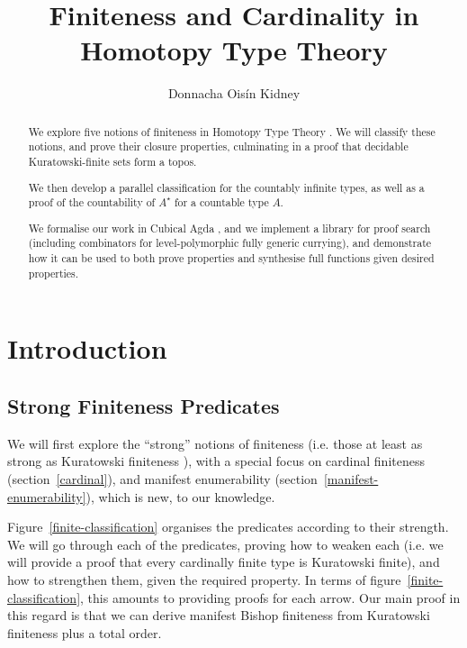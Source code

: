 
\title{Finiteness and Cardinality in Homotopy Type Theory}
\author{Donnacha Oisín Kidney}

\maketitle
\begin{abstract}
  We explore five notions of finiteness in Homotopy Type Theory \cite{hottbook}.
  We will classify these notions, and prove their closure properties,
  culminating in a proof that decidable Kuratowski-finite sets
  \cite{kuratowskiNotionEnsembleFini1920} form a topos.

  We then develop a parallel classification for the countably infinite types, as
  well as a proof of the countability of \(A^\star\) for a countable type \(A\).

  We formalise our work in Cubical Agda
  \cite{vezzosiCubicalAgdaDependently2019}, and we implement a library for proof
  search (including combinators for level-polymorphic fully generic currying),
  and demonstrate how it can be used to both prove properties and synthesise
  full functions given desired properties.
\end{abstract}
\section{Introduction}
\subsection{Strong Finiteness Predicates}

We will first explore the ``strong'' notions of finiteness (i.e. those at least
as strong as Kuratowski finiteness \cite{kuratowskiNotionEnsembleFini1920}),
with a special focus on cardinal finiteness (section~\ref{cardinal}), and
manifest enumerability (section~\ref{manifest-enumerability}), which is new, to
our knowledge.

Figure~\ref{finite-classification} organises the predicates according to
their strength.
We will go through each of the predicates, proving how to weaken each (i.e. we
will provide a proof that every cardinally finite type is Kuratowski finite),
and how to strengthen them, given the required property.
In terms of figure~\ref{finite-classification}, this amounts to providing proofs
for each arrow.
Our main proof in this regard is that we can derive manifest Bishop finiteness
from Kuratowski finiteness plus a total order.


